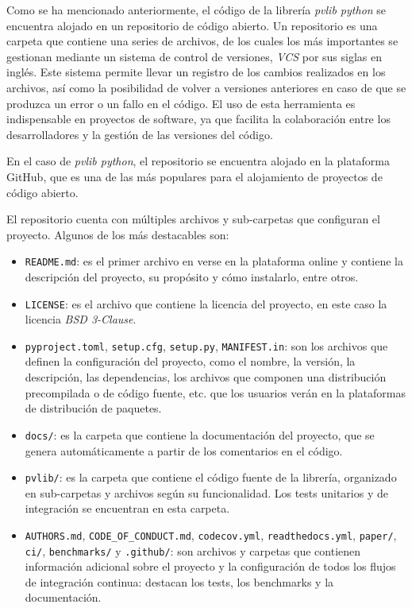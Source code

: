 Como se ha mencionado anteriormente, el código de la librería \textit{pvlib python} se encuentra alojado en un repositorio de código abierto. Un repositorio es una carpeta que contiene una series de archivos, de los cuales los más importantes se gestionan mediante un sistema de control de versiones, \textit{VCS} por sus siglas en inglés. Este sistema permite llevar un registro de los cambios realizados en los archivos, así como la posibilidad de volver a versiones anteriores en caso de que se produzca un error o un fallo en el código. El uso de esta herramienta es indispensable en proyectos de software, ya que facilita la colaboración entre los desarrolladores y la gestión de las versiones del código.

En el caso de \textit{pvlib python}, el repositorio se encuentra alojado en la plataforma GitHub, que es una de las más populares para el alojamiento de proyectos de código abierto.

El repositorio cuenta con múltiples archivos y sub-carpetas que configuran el proyecto. Algunos de los más destacables son:

\begin{itemize}
      \item \texttt{README.md}: es el primer archivo en verse en la plataforma online y contiene la descripción del proyecto, su propósito y cómo instalarlo, entre otros.
      \item \texttt{LICENSE}: es el archivo que contiene la licencia del proyecto, en este caso la licencia \textit{BSD 3-Clause}.
      \item \texttt{pyproject.toml}, \texttt{setup.cfg}, \texttt{setup.py}, \texttt{MANIFEST.in}: son los archivos que definen la configuración del proyecto, como el nombre, la versión, la descripción, las dependencias, los archivos que componen una distribución precompilada o de código fuente, etc. que los usuarios verán en la plataformas de distribución de paquetes.
      \item \texttt{docs/}: es la carpeta que contiene la documentación del proyecto, que se genera automáticamente a partir de los comentarios en el código.
      \item \texttt{pvlib/}: es la carpeta que contiene el código fuente de la librería, organizado en sub-carpetas y archivos según su funcionalidad. Los tests unitarios y de integración se encuentran en esta carpeta.
      \item \texttt{AUTHORS.md}, \texttt{CODE\_OF\_CONDUCT.md}, \texttt{codecov.yml}, \texttt{readthedocs.yml}, \texttt{paper/}, \texttt{ci/}, \texttt{benchmarks/} y \texttt{.github/}: son archivos y carpetas que contienen información adicional sobre el proyecto y la configuración de todos los flujos de integración continua: destacan los tests, los benchmarks y la documentación.

\end{itemize}

